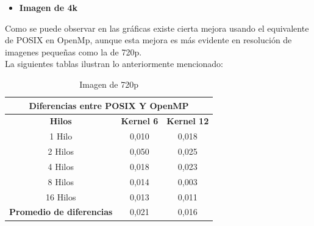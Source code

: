 \documentclass{IEEEtran}
\begin{document}
\begin{itemize}
\item \textbf{Imagen de 4k}



\end{itemize}

Como se puede observar en las gráficas existe cierta mejora usando el equivalente de POSIX en OpenMp, aunque esta mejora es más evidente en resolución de imagenes pequeñas como la de 720p.\\
La siguientes tablas ilustran lo anteriormente mencionado:\\
\begin{table}[H]
\centering
    \begin{tabular}{ |c|c|c| } 
\hline
\multicolumn{3}{|c|}{\textbf{Diferencias entre POSIX Y OpenMP}} \\
\hline
\textbf{Hilos} & \textbf{Kernel 6} & \textbf{Kernel 12}\\
\hline
1 Hilo & 0,010 & 0,018\\
 \hline
2 Hilos & 0,050 & 0,025 \\ 
 \hline
4 Hilos & 0,018 & 0,023 \\ 
 \hline
8 Hilos & 0,014 & 0,003\\ 
 \hline
16 Hilos & 0,013 & 0,011\\ 
\hline
\textbf{Promedio de diferencias} & 0,021 & 0,016\\ 
\hline
\end{tabular}
\caption{Imagen de 720p}
\end{table}
\end{document}
